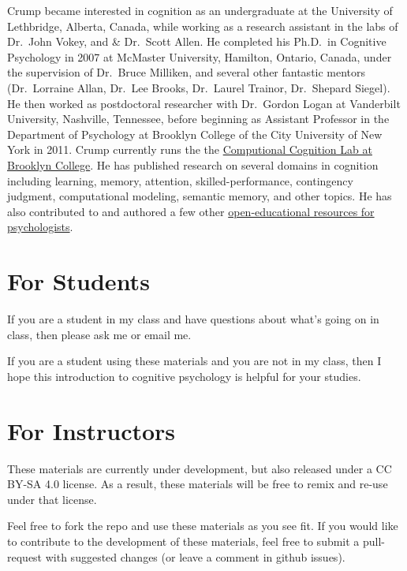 \documentclass[
  oneside,
  12pt]{crumpbook}
\begin{document}
Crump became interested in cognition as an undergraduate at the University of Lethbridge, Alberta, Canada, while working as a research assistant in the labs of Dr.~John Vokey, and \& Dr.~Scott Allen. He completed his Ph.D.~in Cognitive Psychology in 2007 at McMaster University, Hamilton, Ontario, Canada, under the supervision of Dr.~Bruce Milliken, and several other fantastic mentors (Dr.~Lorraine Allan, Dr.~Lee Brooks, Dr.~Laurel Trainor, Dr.~Shepard Siegel). He then worked as postdoctoral researcher with Dr.~Gordon Logan at Vanderbilt University, Nashville, Tennessee, before beginning as Assistant Professor in the Department of Psychology at Brooklyn College of the City University of New York in 2011. Crump currently runs the the \href{https://www.crumplab.com}{Computional Cognition Lab at Brooklyn College}. He has published research on several domains in cognition including learning, memory, attention, skilled-performance, contingency judgment, computational modeling, semantic memory, and other topics. He has also contributed to and authored a few other \href{https://www.crumplab.com/Books.html}{open-educational resources for psychologists}.

\hypertarget{for-students}{%
\section{For Students}\label{for-students}}

If you are a student in my class and have questions about what's going on in class, then please ask me or email me.

If you are a student using these materials and you are not in my class, then I hope this introduction to cognitive psychology is helpful for your studies.

\hypertarget{for-instructors}{%
\section{For Instructors}\label{for-instructors}}

These materials are currently under development, but also released under a CC BY-SA 4.0 license. As a result, these materials will be free to remix and re-use under that license.

Feel free to fork the repo and use these materials as you see fit. If you would like to contribute to the development of these materials, feel free to submit a pull-request with suggested changes (or leave a comment in github issues).
\end{document}
